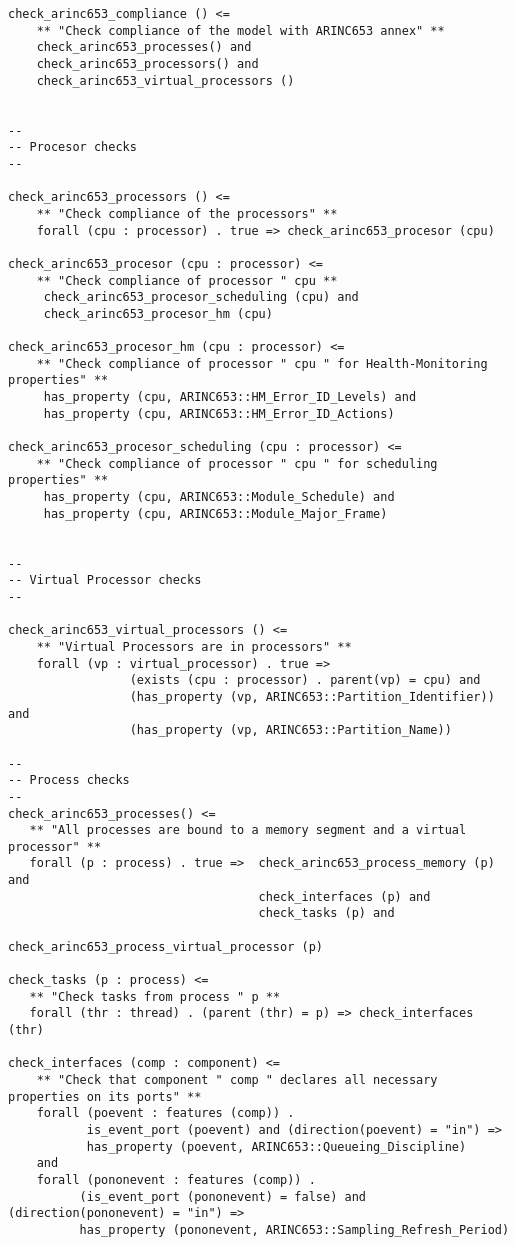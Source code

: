 \documentclass[times, 10pt]{article}
\begin{document}
\begin{lstlisting}
check_arinc653_compliance () <=
	** "Check compliance of the model with ARINC653 annex" **
	check_arinc653_processes() and
	check_arinc653_processors() and
	check_arinc653_virtual_processors ()


--
-- Procesor checks
--
    
check_arinc653_processors () <=
	** "Check compliance of the processors" **
	forall (cpu : processor) . true => check_arinc653_procesor (cpu)

check_arinc653_procesor (cpu : processor) <=
	** "Check compliance of processor " cpu **
	 check_arinc653_procesor_scheduling (cpu) and
	 check_arinc653_procesor_hm (cpu)
		 
check_arinc653_procesor_hm (cpu : processor) <=
	** "Check compliance of processor " cpu " for Health-Monitoring properties" **
	 has_property (cpu, ARINC653::HM_Error_ID_Levels) and
	 has_property (cpu, ARINC653::HM_Error_ID_Actions)

check_arinc653_procesor_scheduling (cpu : processor) <=
	** "Check compliance of processor " cpu " for scheduling properties" **
	 has_property (cpu, ARINC653::Module_Schedule) and
	 has_property (cpu, ARINC653::Module_Major_Frame)
	
	
-- 
-- Virtual Processor checks
--
	
check_arinc653_virtual_processors () <=
	** "Virtual Processors are in processors" **
	forall (vp : virtual_processor) . true => 
	             (exists (cpu : processor) . parent(vp) = cpu) and
	             (has_property (vp, ARINC653::Partition_Identifier)) and
	             (has_property (vp, ARINC653::Partition_Name))

--
-- Process checks
--
check_arinc653_processes() <=
   ** "All processes are bound to a memory segment and a virtual processor" **
   forall (p : process) . true =>  check_arinc653_process_memory (p) and 
                                   check_interfaces (p) and
                                   check_tasks (p) and 
                                   check_arinc653_process_virtual_processor (p)

check_tasks (p : process) <=
   ** "Check tasks from process " p **
   forall (thr : thread) . (parent (thr) = p) => check_interfaces (thr) 

check_interfaces (comp : component) <=
	** "Check that component " comp " declares all necessary properties on its ports" **
	forall (poevent : features (comp)) . 
           is_event_port (poevent) and (direction(poevent) = "in") => 
           has_property (poevent, ARINC653::Queueing_Discipline)
	and
	forall (pononevent : features (comp)) . 
          (is_event_port (pononevent) = false) and (direction(pononevent) = "in") => 
          has_property (pononevent, ARINC653::Sampling_Refresh_Period)



\end{lstlisting}
\end{document}
